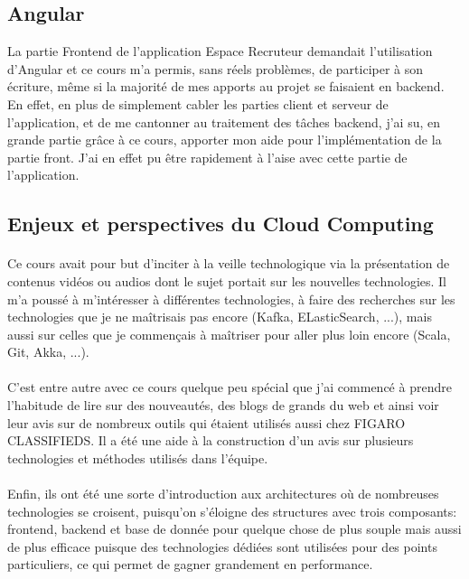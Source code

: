 \subsection{Angular}
\label{sub:Angular}
La partie Frontend de l'application Espace Recruteur demandait l'utilisation d'Angular et ce cours m'a permis, sans réels problèmes, de participer à son écriture, même si la majorité de mes apports au projet se faisaient en backend.
En effet, en plus de simplement cabler les parties client et serveur de l'application, et de me cantonner au traitement des tâches backend, j'ai su, en grande partie grâce à ce cours, apporter mon aide pour l'implémentation de la partie front.
J'ai en effet pu être rapidement à l'aise avec cette partie de l'application.

\subsection{Enjeux et perspectives du Cloud Computing}
\label{sub:Enjeux et perspectives du Cloud Computing}
\paragraph{}
Ce cours avait pour but d'inciter à la veille technologique via la présentation de contenus vidéos ou audios dont le sujet portait sur les nouvelles technologies.
Il m'a poussé à m'intéresser à différentes technologies, à faire des recherches sur les technologies que je ne maîtrisais pas encore (Kafka, ELasticSearch, ...), mais aussi sur celles que je commençais à maîtriser pour aller plus loin encore (Scala, Git, Akka, ...).
\paragraph{}
C'est entre autre avec ce cours quelque peu spécial que j'ai commencé à prendre l'habitude de lire sur des nouveautés, des blogs de grands du web et ainsi voir leur avis sur de nombreux outils qui étaient utilisés aussi chez FIGARO CLASSIFIEDS.
Il a été une aide à la construction d'un avis sur plusieurs technologies et méthodes utilisés dans l'équipe.
\paragraph{}
Enfin, ils ont été une sorte d'introduction aux architectures où de nombreuses technologies se croisent, puisqu'on s'éloigne des structures avec trois composants: frontend, backend et base de donnée pour quelque chose de plus souple mais aussi de plus efficace puisque des technologies dédiées sont utilisées pour des points particuliers, ce qui permet de gagner grandement en performance.

